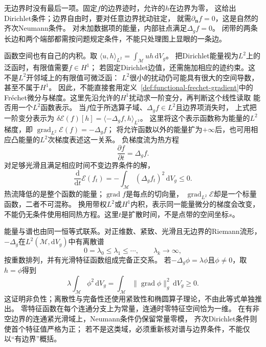 无边界时没有最后一项。固定$f$的边界迹时，允许的$h$在边界为零，
这给出Dirichlet条件；边界自由时，要对任意边界扰动驻定，
就需$\partial_{\bm n}f=0$，这是自然的齐次Neumann条件。
对未加数据项的能量，内部驻点满足$\Delta_gf=0$。
闭带的两条长边和两个端部都需按问题规定条件，不能只处理图上显眼的一条边。

函数空间也有自己的内积。取
$\langle u,h\rangle_{L^2}=\int_{\mathcal M}uh\,\mathrm dV_g$。
把Dirichlet能量视为$L^2$上的泛函时，有限值需要$f\in H^1$；
若固定Dirichlet边值，还需施加相应的迹约束。这不是$L^2$开邻域上的有限值可微泛函：
$L^2$很小的扰动仍可能具有很大的空间导数，甚至不属于$H^1$。
因此，不能直接套用定义~\ref{def:functional-frechet-gradient}中的
Fréchet微分与梯度。这里先沿允许的$H^1$扰动求一阶变分，再判断这个线性读取
能否用一个$L^2$函数表示。
当$f$位于所选算子域、$\Delta_gf\in L^2$且边界项消失时，
上式把一阶变分表示为
$\delta\mathcal E(f)[h]=\langle-\Delta_gf,h\rangle_{L^2}$。
这里将这个表示函数称为能量的$L^2$梯度，即
$\operatorname{grad}_{L^2}\mathcal E(f)=-\Delta_gf$；
将允许函数以外的能量扩为$+\infty$后，也可用相应凸能量的$L^2$次梯度表述这一关系。
负梯度流为热方程
\begin{equation}
 \frac{\partial f}{\partial t}=\Delta_gf.
 \label{eq:geometry-heat-equation}
\end{equation}
对足够光滑且满足相应时间不变边界条件的解，
\[
 \frac{\mathrm d}{\mathrm dt}\mathcal E(f_t)
 =-\int_{\mathcal M}(\Delta_gf_t)^2\,\mathrm dV_g\leq0.
\]
热流降低的是整个函数的能量；$\operatorname{grad}f$是每点的切向量，
$\operatorname{grad}_{L^2}\mathcal E$却是一个标量函数，二者不可混称。
换用带权$L^2$或$H^1$内积，表示同一能量微分的梯度会改变，
不能仍无条件使用相同热方程。这里$t$是扩散时间，不是点带的空间坐标$s$。

能量与谱也由同一恒等式联系。对正维数、紧致、光滑且无边界的Riemann流形，
$-\Delta_g$在$L^2(\mathcal M,\mathrm dV_g)$中有离散谱
\[
 0=\lambda_0\leq\lambda_1\leq\cdots,\qquad\lambda_k\longrightarrow\infty,
\]
按重数排列，并有光滑特征函数组成完备正交系。
若$-\Delta_g\phi=\lambda\phi$且$\phi\neq0$，取$h=\phi$得到
\[
 \lambda\int_{\mathcal M}\phi^2\,\mathrm dV_g
 =\int_{\mathcal M}\lVert\operatorname{grad}\phi\rVert_g^2\,\mathrm dV_g
 \geq0.
\]
这证明非负性；离散性与完备性还使用紧致性和椭圆算子理论，不由此等式单独推出。
零特征函数在每个连通分支上为常量，连通时零特征空间恰为一维。
在有非空边界的连通紧光滑域上，Neumann条件仍保留常量零模，
齐次Dirichlet条件则使首个特征值严格为正；
若不是这类域，必须重新核对谱与边界条件，不能仅以“有边界”概括。

